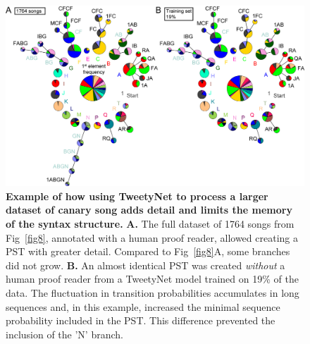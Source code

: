 \documentclass[10pt,letterpaper]{article}
\begin{document}
\begin{figure}[!h]
\includegraphics[scale=0.85]{Figures/fig9/Figure9_v3.png}
\caption{{\bf Example of how using TweetyNet to process a larger dataset of canary song adds detail and limits the memory of the syntax structure.}
\textbf{A.} The full dataset of 1764 songs from Fig~\ref{fig8}, annotated with a human proof reader, allowed creating a PST with greater detail. Compared to Fig~\ref{fig8}A, some branches did not grow.
\textbf{B.} An almost identical PST was created \textit{without} a human proof reader from a TweetyNet model trained on 19\% of the data. The fluctuation in transition probabilities accumulates in long sequences and, in this example, increased the minimal sequence probability included in the PST. This difference prevented the inclusion of the 'N' branch.}
\label{fig9}
\end{figure}
\end{document}
